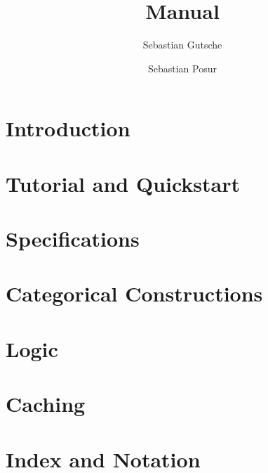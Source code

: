 \documentclass[12pt]{amsbook}
\author{Sebastian Gutsche}
\author{Sebastian Posur}
\begin{document}
\title[Cap Manual]{\CapPkg Manual}

\maketitle

\chapter{Introduction}
  
  
\chapter{Tutorial and Quickstart}
  

\chapter{Specifications}
  

\chapter{Categorical Constructions}
  

\chapter{Logic}
  

\chapter{Caching}
  

\chapter{Index and Notation}
  





\end{document}
